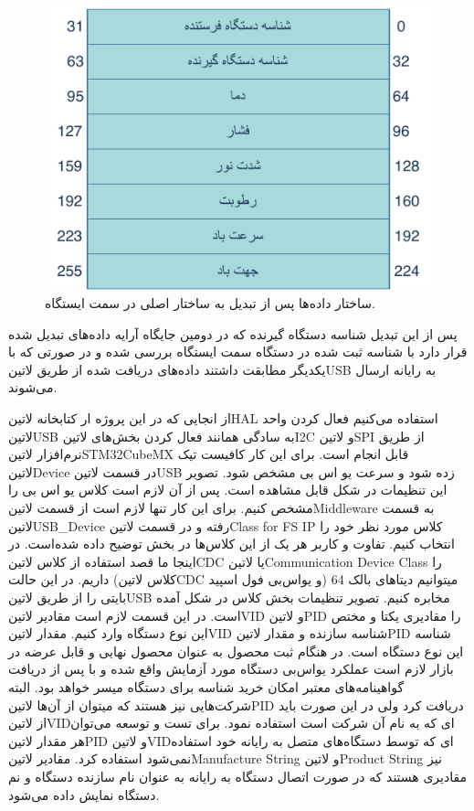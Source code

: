 \begin{figure}[H]
	\centering
	\includegraphics[width=0.6\linewidth]{Assets/sensorData.pdf}
	\caption{ساختار داده‌ها پس از تبدیل به ساختار اصلی در سمت ایستگاه.}
	\label{fig:sensorDataConverted}
\end{figure}

پس از این تبدیل شناسه دستگاه گیرنده که در دومین جایگاه آرایه داده‌های تبدیل شده قرار دارد با شناسه ثبت شده در دستگاه سمت ایستگاه بررسی شده و در صورتی که با یکدیگر مطابقت داشتند داده‌های دریافت شده از طریق ‌لاتین{USB} به رایانه ارسال می‌شوند.

از ‌انجایی که در این پروژه ار کتابخانه ‌لاتین{HAL} استفاده می‌کنیم فعال کردن واحد ‌لاتین{USB} به سادگی همانند فعال کردن بخش‌های ‌لاتین{I2C} و ‌لاتین{SPI} از طریق نر‌م‌افزار ‌لاتین{STM32CubeMX} قابل انجام است. برای این کار کافیست تیک ‌لاتین{Device} در قسمت ‌لاتین{USB} زده شود و سرعت یو اس بی مشخص شود. تصویر این تنظیمات در شکل  قابل مشاهده است. پس از آن لازم است کلاس یو اس بی را مشخص کنیم. برای این کار تنها لازم است از قسمت ‌لاتین{Middleware} به قسمت ‌لاتین{USB\_Device} رفته و در قسمت ‌لاتین{Class for FS IP} کلاس مورد نظر خود را انتخاب کنیم. تفاوت و کاربر هر یک از این کلاس‌ها در بخش  توضیح داده شده‌است. در اینجا ما قصد استفاده از کلاس ‌لاتین{CDC} یا ‌لاتین{Communication Device Class} را داریم. در این حالت (کلاس ‌لاتین{CDC} و یو‌اس‌بی فول اسپید) میتوانیم دیتا‌های بالک 64 بایتی را از طریق ‌لاتین{USB} مخابره کنیم. تصویر تنظیمات بخش کلاس در شکل  آمده است. در این قسمت لازم است مقادیر ‌لاتین{VID} و ‌لاتین{PID} را مقادیری یکتا و مختص این نوع دستگاه وارد کنیم. مقدار ‌لاتین{VID} شناسه سازنده و مقدار ‌لاتین{PID} شناسه این نوع دستگاه است. در هنگام ثبت محصول به عنوان محصول نهایی و قابل عرضه در بازار لازم است عملکرد یو‌اس‌بی دستگاه مورد آزمایش واقع شده و با پس از دریافت گواهینامه‌های معتبر امکان خرید شناسه برای دستگاه میسر خواهد بود. البته شرکت‌هایی نیز هستند که میتوان از آن‌ها ‌لاتین{PID} دریافت کرد ولی در این صورت باید از ‌لاتین{VID}ای که به نام آن شرکت است استفاده نمود. برای تست و توسعه می‌توان هر مقدار ‌لاتین{PID} و ‌لاتین{VID}‌ای که توسط دستگاه‌های متصل به رایانه خود استفاده نمی‌شود استفاده کرد. مقادیر ‌لاتین{Manufacture String} و ‌لاتین{Product String} نیز مقادیری هستند که در صورت اتصال دستگاه به رایانه به عنوان نام سازنده دستگاه و نم دستگاه نمایش داده می‌شود.

